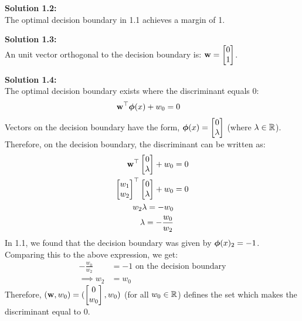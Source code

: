 \documentclass[submit]{harvardml}
\begin{document}
\noindent\textbf{Solution 1.2:}\\
The optimal decision boundary in 1.1 achieves a margin of 1.

\noindent\textbf{Solution 1.3:}\\
An unit vector orthogonal to the decision boundary is: $\mathbf{w} = \begin{bmatrix} 0 \\ 1 \\ \end{bmatrix}$.

\noindent\textbf{Solution 1.4:}\\
The optimal decision boundary exists where the discriminant equals 0:
\begin{align*}
    \mathbf{w}^\top \boldsymbol{\phi}(x) + w_0 &= 0
\end{align*}
Vectors on the decision boundary have the form, $\boldsymbol{\phi}(x) = \begin{bmatrix} 0 \\ \lambda \\ \end{bmatrix}$ (where $\lambda \in \mathbb{R}$). Therefore, on the decision boundary, the discriminant can be written as:
\begin{align*}
    \mathbf{w}^\top \begin{bmatrix} 0\\ \lambda \\ \end{bmatrix} + w_0 &= 0\\
    \begin{bmatrix} w_1 \\ w_2 \\ \end{bmatrix}^\top \begin{bmatrix} 0\\ \lambda \\ \end{bmatrix} + w_0 &= 0\\
    w_2 \lambda = -w_0\\
    \lambda = -\frac{w_0}{w_2}
\end{align*}
In 1.1, we found that the decision boundary was given by $\boldsymbol{\phi}(x)_2 = -1$. Comparing this to the above expression, we get:
\begin{align*}
    -\frac{w_0}{w_2} &= -1 \text{  on the decision boundary}\\
    \implies  w_2 &= w_0
\end{align*}
Therefore, $(\mathbf{w}, w_0) = (\begin{bmatrix} 0 \\ w_0 \\ \end{bmatrix}, w_0)$ (for all $w_0 \in \mathbb{R}$) defines the set which makes the discriminant equal to 0.
\end{document}
